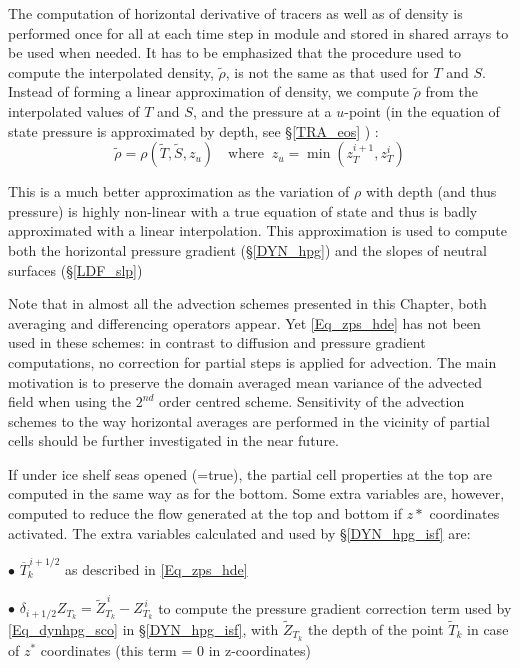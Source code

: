 \documentclass[NEMO_book]{subfiles}
\begin{document}
The computation of horizontal derivative of tracers as well as of density is 
performed once for all at each time step in  module and stored 
in shared arrays to be used when needed. It has to be emphasized that the 
procedure used to compute the interpolated density, $\widetilde{\rho}$, is not 
the same as that used for $T$ and $S$. Instead of forming a linear approximation 
of density, we compute $\widetilde{\rho }$ from the interpolated values of $T$ 
and $S$, and the pressure at a $u$-point (in the equation of state pressure is 
approximated by depth, see \S\ref{TRA_eos} ) : 
\begin{equation} \label{Eq_zps_hde_rho}
\widetilde{\rho } = \rho ( {\widetilde{T},\widetilde {S},z_u }) 
\quad \text{where }\  z_u = \min \left( {z_T^{i+1} ,z_T^i } \right)
\end{equation} 

This is a much better approximation as the variation of $\rho$ with depth (and 
thus pressure) is highly non-linear with a true equation of state and thus is badly 
approximated with a linear interpolation. This approximation is used to compute 
both the horizontal pressure gradient (\S\ref{DYN_hpg}) and the slopes of neutral 
surfaces (\S\ref{LDF_slp})

Note that in almost all the advection schemes presented in this Chapter, both 
averaging and differencing operators appear. Yet \eqref{Eq_zps_hde} has not 
been used in these schemes: in contrast to diffusion and pressure gradient 
computations, no correction for partial steps is applied for advection. The main 
motivation is to preserve the domain averaged mean variance of the advected 
field when using the $2^{nd}$ order centred scheme. Sensitivity of the advection 
schemes to the way horizontal averages are performed in the vicinity of partial 
cells should be further investigated in the near future.

If under ice shelf seas opened (=true), the partial cell properties 
at the top are computed in the same way as for the bottom. Some extra variables are, 
however, computed to reduce the flow generated at the top and bottom if $z*$ coordinates activated.
The extra variables calculated and used by \S\ref{DYN_hpg_isf} are:

$\bullet$ $\overline{T}_k^{\,i+1/2}$ as described in \eqref{Eq_zps_hde}

$\bullet$ $\delta _{i+1/2} Z_{T_k} = \widetilde {Z}^{\,i}_{T_k}-Z^{\,i}_{T_k}$ to compute 
the pressure gradient correction term used by \eqref{Eq_dynhpg_sco} in \S\ref{DYN_hpg_isf},
 with $\widetilde {Z}_{T_k}$ the depth of the point $\widetilde {T}_{k}$ in case of $z^*$ coordinates 
(this term = 0 in z-coordinates)
\end{document}
